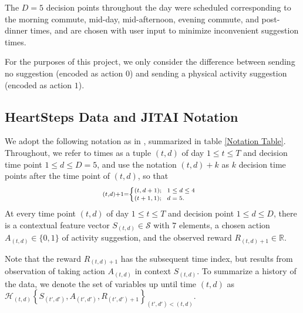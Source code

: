 The $D=5$ decision points throughout the day were scheduled corresponding to the morning commute, mid-day, mid-afternoon, evening commute, and post-dinner times, and are chosen with user input to minimize inconvenient suggestion times.

For the purposes of this project, we only consider the difference between sending no suggestion (encoded as action $0$) and sending a physical activity suggestion (encoded as action $1$).



\subsection{HeartSteps Data and JITAI Notation}

	We adopt the following notation as in \citet{Liao2015}, summarized in table \ref{Notation Table}.  Throughout, we refer to times as a tuple $(t,d)$ of day $1 \le t \le T$ and decision time point $1 \le d \le D = 5$, and use the notation $(t,d) + k$ as $k$ decision time points after the time point of $(t,d)$, so that $$\scriptstyle \scriptsize (t,d) + 1 = \begin{cases}
(t,d+1);\ \  1 \le d \le 4 \\
(t+1, 1); \ \ d = 5.
\end{cases}$$
	At every time point $(t,d)$ of day $1 \le t \le T$ and decision point $1 \le d \le D$, there is a contextual feature vector $S_{(t,d)} \in \mathcal{S}$ with $7$ elements, a chosen action $A_{(t,d)} \in \{0,1\}$ of activity suggestion, and the observed reward $R_{(t,d)+1} \in \mathbb{R}$.  
	
	Note that the reward $R_{(t,d)+1}$ has the subsequent time index, but results from observation of taking action $A_{(t,d)}$ in context $S_{(t,d)}$.  To summarize a history of the data, we denote the set of variables up until time $(t,d)$ as $\mathcal{H}_{(t,d)}\left\{S_{(t',d')}, A_{(t',d')}, R_{(t',d') + 1} \right\}_{(t',d') < (t,d)}$\label{HistorySet}.

